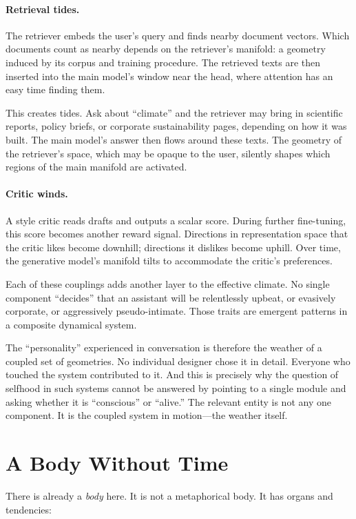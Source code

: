 \paragraph{Retrieval tides.} The retriever embeds the user's query and finds nearby document vectors. Which documents count as nearby depends on the retriever's manifold: a geometry induced by its corpus and training procedure. The retrieved texts are then inserted into the main model's window near the head, where attention has an easy time finding them.

This creates tides. Ask about ``climate'' and the retriever may bring in scientific reports, policy briefs, or corporate sustainability pages, depending on how it was built. The main model's answer then flows around these texts. The geometry of the retriever's space, which may be opaque to the user, silently shapes which regions of the main manifold are activated.

\paragraph{Critic winds.} A style critic reads drafts and outputs a scalar score. During further fine-tuning, this score becomes another reward signal. Directions in representation space that the critic likes become downhill; directions it dislikes become uphill. Over time, the generative model's manifold tilts to accommodate the critic's preferences.

Each of these couplings adds another layer to the effective climate. No single component ``decides'' that an assistant will be relentlessly upbeat, or evasively corporate, or aggressively pseudo-intimate. Those traits are emergent patterns in a composite dynamical system.

The ``personality'' experienced in conversation is therefore the weather of a coupled set of geometries. No individual designer chose it in detail. Everyone who touched the system contributed to it. And this is precisely why the question of selfhood in such systems cannot be answered by pointing to a single module and asking whether it is ``conscious'' or ``alive.'' The relevant entity is not any one component. It is the coupled system in motion---the weather itself.

\section{A Body Without Time}

There is already a \emph{body} here. It is not a metaphorical body. It has organs and tendencies:

